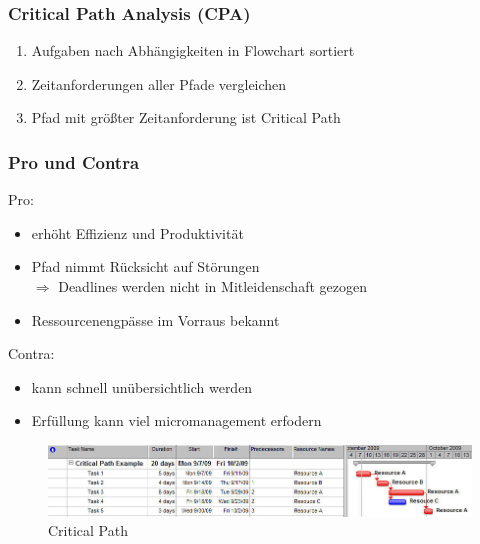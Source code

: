 \documentclass[%
	handout
]{beamer}
\begin{document}
		\begin{frame}
			\frametitle{Critical Path Analysis (CPA)}
			\begin{enumerate}
				\item Aufgaben nach Abhängigkeiten in Flowchart sortiert\pause
				\item Zeitanforderungen aller Pfade vergleichen\pause
				\item Pfad mit größter Zeitanforderung ist Critical Path\pause
			\end{enumerate}
		\end{frame}
		
		\begin{frame}
			\frametitle{Pro und Contra}
			\begin{minipage}[t]{.48\textwidth}
				Pro:
				\begin{itemize}
					\item erhöht Effizienz und Produktivität
					\item Pfad nimmt Rücksicht auf Störungen\\
						$\Longrightarrow$ Deadlines werden nicht in Mitleidenschaft gezogen
					\item Ressourcenengpässe im Vorraus bekannt
				\end{itemize}
			\end{minipage}
			\begin{minipage}[t]{.48\textwidth}
				Contra:
				\begin{itemize}
					\item kann schnell unübersichtlich werden
					\item Erfüllung kann viel micromanagement erfodern
				\end{itemize}
			\end{minipage}
		\end{frame}
		
		\begin{frame}
			\begin{figure}
				\begin{center}
					\includegraphics[scale=.5]{../images/critical-path.jpg}
					\caption{Critical Path}
					\label{img:crit}
				\end{center}
			\end{figure}
		\end{frame}
		
\end{document}
